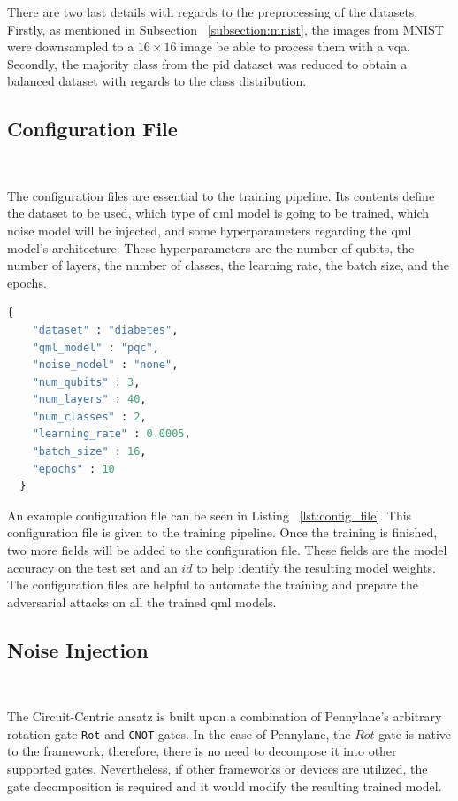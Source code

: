 There are two last details with regards to the preprocessing
of the datasets. Firstly, as mentioned in Subsection
~\ref{subsection:mnist}, the images from MNIST were downsampled
to a \(16 \times 16\) image be able to process them with a \ac{vqa}.
Secondly, the majority class from the \ac{pid} dataset was
reduced to obtain a balanced dataset with regards to the
class distribution. \

\subsection{Configuration File}\label{subsection:config} \

The configuration files are essential to the training
pipeline. Its contents define the dataset to be used,
which type of \ac{qml} model is going to be trained,
which noise model will be injected, and some hyperparameters
regarding the \ac{qml} model's architecture. These hyperparameters
are the number of qubits, the number of layers, the number of
classes, the learning rate, the batch size, and the epochs. \

\begin{lstlisting}[language=Python, caption={Example configuration file.}, label=lst:config_file]
  {
    "dataset" : "diabetes",
    "qml_model" : "pqc",
    "noise_model" : "none",
    "num_qubits" : 3,
    "num_layers" : 40,
    "num_classes" : 2,
    "learning_rate" : 0.0005,
    "batch_size" : 16,
    "epochs" : 10
  }
\end{lstlisting}

An example configuration file can be seen in Listing
~\ref{lst:config_file}. This configuration file is given
to the training pipeline. Once the training is finished,
two more fields will be added to the configuration file.
These fields are the model accuracy on the test set and an
\(id\) to help identify the resulting model weights. The
configuration files are helpful to automate the training
and prepare the adversarial attacks on all the trained
\ac{qml} models. \

\subsection{Noise Injection}\label{subsection:noise_injection} \

The Circuit-Centric ansatz is built upon a combination of 
Pennylane's arbitrary rotation gate \colorbox{inline_gray}{\lstinline|Rot|}
and \colorbox{inline_gray}{\lstinline|CNOT|} gates. In the case
of Pennylane, the \(Rot\) gate is native to the framework, therefore,
there is no need to decompose it into other supported gates.
Nevertheless, if other frameworks or devices are utilized,
the gate decomposition is required and it would modify the resulting
trained model. \

